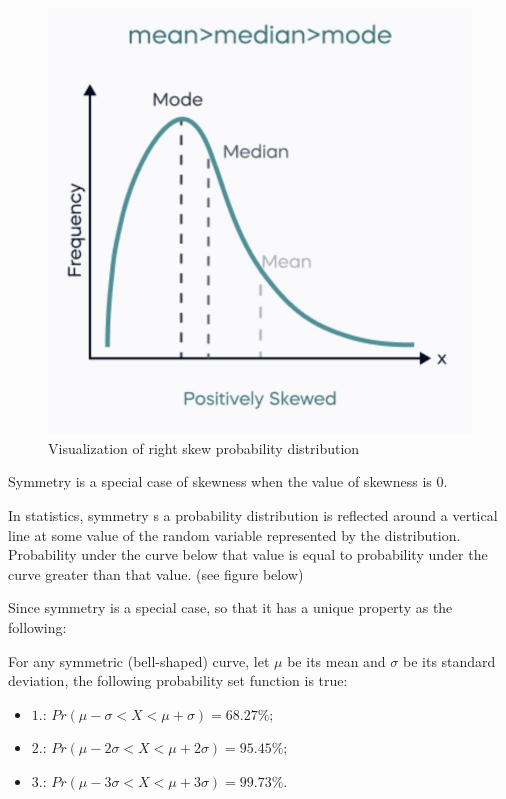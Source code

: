 \begin{figure}[H]
 \centering
 \includegraphics[scale=0.45]{Section1/img/Rightskew.jpg}
 \caption{Visualization of right skew probability distribution}
\end{figure}

Symmetry is a special case of skewness when the value of skewness is $0$.

\begin{definition}[Symmetry]
In statistics, symmetry s a probability distribution is reflected around a vertical line at some value of the random variable represented by the distribution. Probability under the curve below that value is equal to probability under the curve greater than that value. (see figure below)
\end{definition}

Since symmetry is a special case, so that it has a unique property as the following:

\begin{theorem}
For any symmetric (bell-shaped) curve, let $\mu$ be its mean and $\sigma$ be its standard deviation, the following probability set function is true:
   \begin{itemize}
    \item  $1.$: $Pr(\mu - \sigma < X < \mu + \sigma) = 68.27\%;$
    \item  $2.$: $Pr(\mu - 2\sigma < X < \mu + 2\sigma) = 95.45\%;$
    \item  $3.$: $Pr(\mu - 3\sigma < X < \mu + 3\sigma) = 99.73\%.$
   \end{itemize}
\end{theorem}

